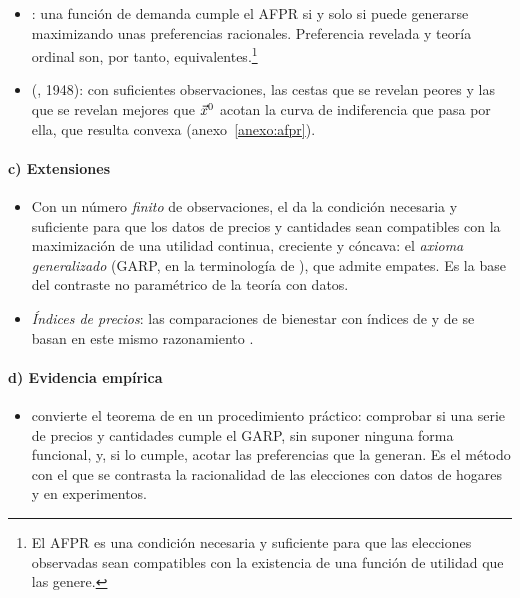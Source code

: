 \documentclass[11pt]{article}
\begin{document}
\begin{itemize}
\item {}: una función de demanda cumple el AFPR si y solo si puede generarse maximizando unas preferencias racionales. Preferencia revelada y teoría ordinal son, por tanto, equivalentes.\footnote{El AFPR es una condición necesaria y suficiente para que las elecciones observadas sean compatibles con la existencia de una función de utilidad que las genere\nocite{MasColellWhinstonGreen1995}.}
\item {} (, 1948): con suficientes observaciones, las cestas que se revelan peores y las que se revelan mejores que $\vec{x}^0$ acotan la curva de indiferencia que pasa por ella, que resulta convexa (anexo~\ref{anexo:afpr}).
\end{itemize}

\paragraph{c) Extensiones}

\begin{itemize}
\item Con un número \emph{finito} de observaciones, el  \textcite{Afriat1967Construction} da la condición necesaria y suficiente para que los datos de precios y cantidades sean compatibles con la maximización de una utilidad continua, creciente y cóncava: el \emph{axioma generalizado} (GARP, en la terminología de \textcite{Varian1982Nonparametric}), que admite empates. Es la base del contraste no paramétrico de la teoría con datos.
\item \emph{Índices de precios}: las comparaciones de bienestar con índices de  y de  se basan en este mismo razonamiento .
\end{itemize}

\paragraph{d) Evidencia empírica}

\begin{itemize}
\item \textcite{Varian1982Nonparametric} convierte el teorema de  en un procedimiento práctico: comprobar si una serie de precios y cantidades cumple el GARP, sin suponer ninguna forma funcional, y, si lo cumple, acotar las preferencias que la generan. Es el método con el que se contrasta la racionalidad de las elecciones con datos de hogares y en experimentos.
\end{itemize}
\end{document}
